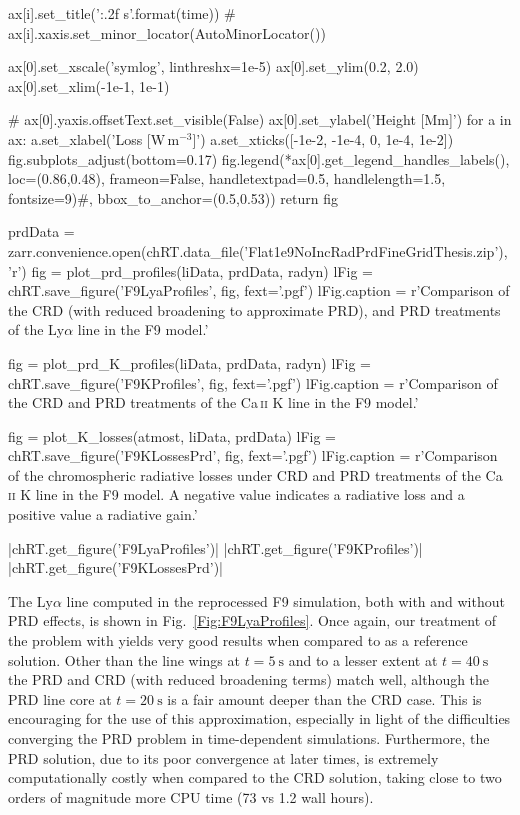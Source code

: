 \begin{pycode}[TimeDepRT]
        ax[i].set_title('{:.2f} s'.format(time))
        # ax[i].xaxis.set_minor_locator(AutoMinorLocator())

    ax[0].set_xscale('symlog', linthreshx=1e-5)
    ax[0].set_ylim(0.2, 2.0)
    ax[0].set_xlim(-1e-1, 1e-1)

    # ax[0].yaxis.offsetText.set_visible(False)
    ax[0].set_ylabel('Height [Mm]')
    for a in ax:
        a.set_xlabel('Loss [W\,m$^{-3}$]')
        a.set_xticks([-1e-2, -1e-4, 0, 1e-4, 1e-2])
    fig.subplots_adjust(bottom=0.17)
    fig.legend(*ax[0].get_legend_handles_labels(), loc=(0.86,0.48), frameon=False,
               handletextpad=0.5, handlelength=1.5, fontsize=9)#, bbox_to_anchor=(0.5,0.53))
    return fig

prdData = zarr.convenience.open(chRT.data_file('Flat1e9NoIncRadPrdFineGridThesis.zip'), 'r')
fig = plot_prd_profiles(liData, prdData, radyn)
lFig = chRT.save_figure('F9LyaProfiles', fig, fext='.pgf')
lFig.caption = r'Comparison of the CRD (with reduced broadening to approximate PRD), and PRD treatments of the Ly$\alpha$ line in the F9 model.'

fig = plot_prd_K_profiles(liData, prdData, radyn)
lFig = chRT.save_figure('F9KProfiles', fig, fext='.pgf')
lFig.caption = r'Comparison of the CRD and PRD treatments of the Ca\,\textsc{ii} K line in the F9 model.'

fig = plot_K_losses(atmost, liData, prdData)
lFig = chRT.save_figure('F9KLossesPrd', fig, fext='.pgf')
lFig.caption = r'Comparison of the chromospheric radiative losses under CRD and PRD treatments of the Ca\,\textsc{ii} K line in the F9 model. A negative value indicates a radiative loss and a positive value a radiative gain.'
\end{pycode}
\py[TimeDepRT]|chRT.get_figure('F9LyaProfiles')|
\py[TimeDepRT]|chRT.get_figure('F9KProfiles')|
\py[TimeDepRT]|chRT.get_figure('F9KLossesPrd')|

The Ly$\alpha$ line computed in the reprocessed F9 simulation, both with and without PRD effects, is shown in Fig.~\ref{Fig:F9LyaProfiles}.
Once again, our treatment of the problem with \Lw{} yields very good results when compared to \Radyn{} as a reference solution.
Other than the line wings at $t=\SI{5}{\second}$ and to a lesser extent at $t=\SI{40}{\second}$ the PRD and CRD (with reduced broadening terms) match well, although the PRD line core at $t=\SI{20}{\second}$ is a fair amount deeper than the CRD case.
This is encouraging for the use of this approximation, especially in light of the difficulties converging the PRD problem in time-dependent simulations.
Furthermore, the PRD solution, due to its poor convergence at later times, is extremely computationally costly when compared to the CRD solution, taking close to two orders of magnitude more CPU time (73 vs 1.2 wall hours).

